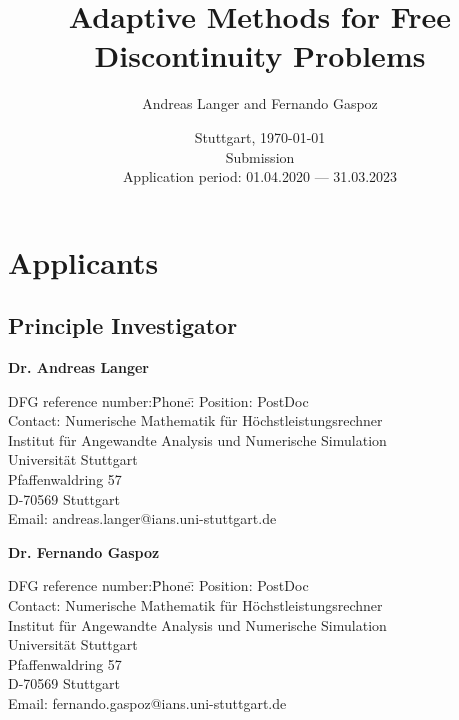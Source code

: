 \documentclass[enabledeprecatedfontcommands,cleardoublepage=empty,headsepline,twoside,11pt,DIV=15,BCOR=12mm,final]{scrartcl}
\begin{document}
\begin{titlepage}\sffamily
  \subject{DFG Research Grant Application} 
  \title{Adaptive Methods for Free Discontinuity Problems}%
  
  \author{Andreas Langer and Fernando Gaspoz}
  \date{Stuttgart, \today \\[50mm] Submission\\[50mm]
    Application period: 01.04.2020 --- 31.03.2023}
\end{titlepage}

\maketitle[-1]
\cleardoublepage
\setcounter{page}{1}
\pagestyle{scrheadings}


\section*{Applicants}

\subsection*{Principle Investigator}

\begin{flushleft}
  \textbf{Dr. Andreas Langer}
  \begin{tabbing}
    DFG reference number:\quad\=Phone:\quad\=\kill
    Position:\>  PostDoc\\
    Contact:\> Numerische Mathematik f\"ur H\"ochstleistungsrechner\\ 
    \>Institut f\"ur Angewandte Analysis und Numerische Simulation\\
    \> Universit\"at Stuttgart\\
    \> Pfaffenwaldring 57 \\
    \> D-70569 Stuttgart\\[1mm]
    \> Email:\> andreas.langer@ians.uni-stuttgart.de\\[1mm]
 \end{tabbing}
\end{flushleft}


\begin{flushleft}
  \textbf{Dr. Fernando Gaspoz}
  \begin{tabbing}
    DFG reference number:\quad\=Phone:\quad\=\kill
    Position:\> PostDoc\\
    Contact:\> Numerische Mathematik f\"ur H\"ochstleistungsrechner\\ 
    \>Institut f\"ur Angewandte Analysis und Numerische Simulation\\
    \> Universit\"at Stuttgart\\
    \> Pfaffenwaldring 57 \\
    \> D-70569 Stuttgart\\[1mm]
    \> Email:\> fernando.gaspoz@ians.uni-stuttgart.de\\[1mm]
 \end{tabbing}
\end{flushleft}
\end{document}
